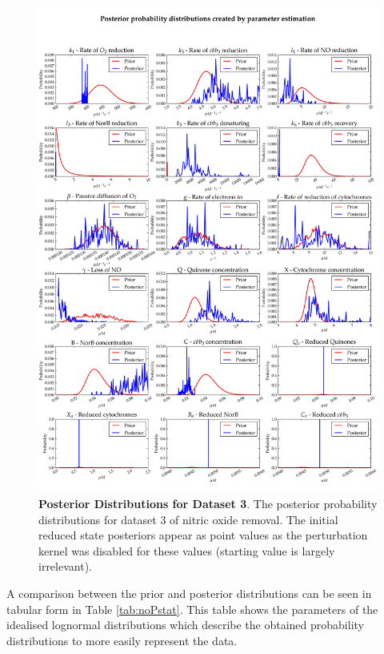 \begin{figure}[p]
 \centering
 \includegraphics[width=15cm, trim=0cm 0cm 0cm 0cm]{./06-noreduction/data/posteriors-2.pdf}
 \caption[Posterior Distributions for Dataset 3]{{\bf Posterior Distributions for Dataset 3}. The posterior probability distributions for dataset 3 of nitric oxide removal. The initial reduced state posteriors appear as point values as the perturbation kernel was disabled for these values (starting value is largely irrelevant).
 \label{fig:dataset3posterior1}}
\end{figure}

A comparison between the prior and posterior distributions can be seen in tabular form in Table \ref{tab:noPstat}. This table shows the parameters of the idealised lognormal distributions which describe the obtained probability distributions to more easily represent the data.

